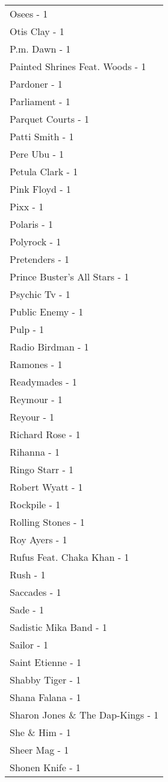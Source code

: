 \documentclass[
]{article}
\begin{document}
\begin{longtable}{l}
Osees - 1 \\ 
Otis Clay - 1 \\ 
P.m. Dawn - 1 \\ 
Painted Shrines Feat. Woods - 1 \\ 
Pardoner - 1 \\ 
Parliament - 1 \\ 
Parquet Courts - 1 \\ 
Patti Smith - 1 \\ 
Pere Ubu - 1 \\ 
Petula Clark - 1 \\ 
Pink Floyd - 1 \\ 
Pixx - 1 \\ 
Polaris - 1 \\ 
Polyrock - 1 \\ 
Pretenders - 1 \\ 
Prince Buster's All Stars - 1 \\ 
Psychic Tv - 1 \\ 
Public Enemy - 1 \\ 
Pulp - 1 \\ 
Radio Birdman - 1 \\ 
Ramones - 1 \\ 
Readymades - 1 \\ 
Reymour - 1 \\ 
Reyour - 1 \\ 
Richard Rose - 1 \\ 
Rihanna - 1 \\ 
Ringo Starr - 1 \\ 
Robert Wyatt - 1 \\ 
Rockpile - 1 \\ 
Rolling Stones - 1 \\ 
Roy Ayers - 1 \\ 
Rufus Feat. Chaka Khan - 1 \\ 
Rush - 1 \\ 
Saccades - 1 \\ 
Sade - 1 \\ 
Sadistic Mika Band - 1 \\ 
Sailor - 1 \\ 
Saint Etienne - 1 \\ 
Shabby Tiger - 1 \\ 
Shana Falana - 1 \\ 
Sharon Jones \& The Dap-Kings - 1 \\ 
She \& Him - 1 \\ 
Sheer Mag - 1 \\ 
Shonen Knife - 1 \\ 

\end{longtable}
\end{document}
